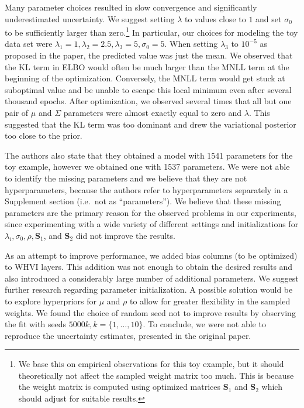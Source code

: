 Many parameter choices resulted in slow convergence and significantly underestimated uncertainty.
We suggest setting $\lambda$ to values close to $1$ and set $\sigma_0$ to be sufficiently larger than zero.\footnote{We base this on empirical observations for this toy example, but it should theoretically not affect the sampled weight matrix too much. This is because the weight matrix is computed using optimized matrices $\mathbf{S}_1$ and $\mathbf{S}_2$ which should adjust for suitable results.}
In particular, our choices for modeling the toy data set were $\lambda_1=1, \lambda_2=2.5,\lambda_3=5, \sigma_0=5$.
When setting $\lambda_3$ to $10^{-5}$ as proposed in the paper, the predicted value was just the mean.
We observed that the KL term in ELBO would often be much larger than the MNLL term at the beginning of the optimization.
Conversely, the MNLL term would get stuck at suboptimal value and be unable to escape this local minimum even after several thousand epochs.
After optimization, we observed several times that all but one pair of $\mu$ and $\Sigma$ parameters were almost exactly equal to zero and $\lambda$.
This suggested that the KL term was too dominant and drew the variational posterior too close to the prior.

The authors also state that they obtained a model with 1541 parameters for the toy example, however we obtained one with 1537 parameters.
We were not able to identify the missing parameters and we believe that they are not hyperparameters, because the authors refer to hyperparameters separately in a Supplement section (i.e.\ not as ``parameters'').
We believe that these missing parameters are the primary reason for the observed problems in our experiments, since experimenting with a wide variety of different settings and initializations for $\lambda_i, \sigma_0, \rho, \mathbf{S}_1$, and $\mathbf{S}_2$ did not improve the results.

As an attempt to improve performance, we added bias columns (to be optimized) to WHVI layers.
This addition was not enough to obtain the desired results and also introduced a considerably large number of additional parameters.
We suggest further research regarding parameter initialization.
A possible solution would be to explore hyperpriors for $\mu$ and $\rho$ to allow for greater flexibility in the sampled weights.
We found the choice of random seed not to improve results by observing the fit with seeds $5000k, k = \{1, \dots, 10\}$.
To conclude, we were not able to reproduce the uncertainty estimates, presented in the original paper.


